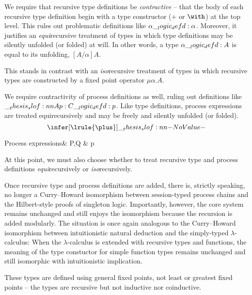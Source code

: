 We require that recursive type definitions be \emph{contractive}\autocite{??} -- that the body of each recursive type definition begin with a type constructor ($\plus$ or $\with$) at the top level.
This rules out problematic definitions like $\alpha \__logic_defd: \alpha$.
Moreover, it justifies an \emph{equi}\-recursive treatment of types in which type definitions may be silently unfolded (or folded) at will.
In other words, a type $\alpha \__logic_defd: A$ is equal to its unfolding, $[A/\alpha]A$.

This stands in contrast with an \emph{iso}\-recursive treatment of types in which recursive types are constructed by a fixed point operator $\mu \alpha.A$.


We require contractivity of process definitions as well, ruling out definitions like $\slof{A |- p : C} \defd p$.
Like type definitions, process expressions are treated equi\-recursively and may be freely and silently unfolded (or folded).
\begin{equation*}
  \infer[\lrule{\plus}]{\slof{}}{}
\end{equation*}

\begin{syntax*}
  Process expressions&
    P,Q & \dotsb \mid p
\end{syntax*}


At this point, we must also choose whether to treat recursive type and process definitions \emph{equi}\-recursively or \emph{iso}\-recursively.


Once recursive type and process definitions are added, there is, strictly speaking, no longer a Curry--Howard isomorphism between session-typed process chains and the Hilbert-style proofs of singleton logic.
Importantly, however, the core system remains unchanged and still enjoys the isomorphism because the recursion is added modularly.
The situation is once again analogous to the Curry--Howard isomorphism between intuitionistic natural deduction and the simply-typed $\lambda$-calculus:
When the $\lambda$-calculus is extended with recursive types and functions, the meaning of the type constuctor for simple function types remains unchanged and still isomorphic with intuitionistic implication.

These types are defined using general fixed points, not least or greatest fixed points -- the types are recursive but not inductive nor coinductive.



